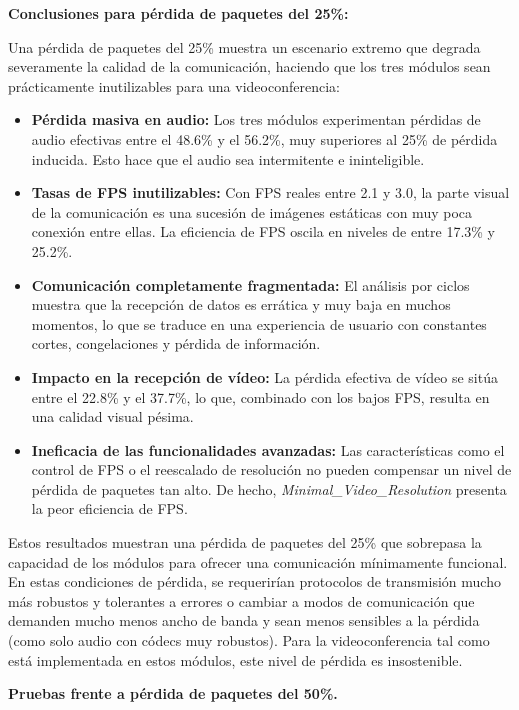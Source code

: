 \textbf{Conclusiones para pérdida de paquetes del 25\%:}

Una pérdida de paquetes del 25\% muestra un escenario extremo que degrada severamente la calidad de la comunicación, haciendo que los tres módulos sean prácticamente inutilizables para una videoconferencia:

\begin{itemize}
\item \textbf{Pérdida masiva en audio:} Los tres módulos experimentan pérdidas de audio efectivas entre el 48.6\% y el 56.2\%, muy superiores al 25\% de pérdida inducida. Esto hace que el audio sea intermitente e ininteligible.
\item \textbf{Tasas de FPS inutilizables:} Con FPS reales entre 2.1 y 3.0, la parte visual de la comunicación es una sucesión de imágenes estáticas con muy poca conexión entre ellas. La eficiencia de FPS oscila en niveles de entre 17.3\% y 25.2\%.
\item \textbf{Comunicación completamente fragmentada:} El análisis por ciclos muestra que la recepción de datos es errática y muy baja en muchos momentos, lo que se traduce en una experiencia de usuario con constantes cortes, congelaciones y pérdida de información.
\item \textbf{Impacto en la recepción de vídeo:} La pérdida efectiva de vídeo se sitúa entre el 22.8\% y el 37.7\%, lo que, combinado con los bajos FPS, resulta en una calidad visual pésima.
\item \textbf{Ineficacia de las funcionalidades avanzadas:} Las características como el control de FPS o el reescalado de resolución no pueden compensar un nivel de pérdida de paquetes tan alto. De hecho, \textit{Minimal\_Video\_Resolution} presenta la peor eficiencia de FPS.
\end{itemize}

Estos resultados muestran una pérdida de paquetes del 25\% que sobrepasa la capacidad de los módulos para ofrecer una comunicación mínimamente funcional. En estas condiciones de pérdida, se requerirían protocolos de transmisión mucho más robustos y tolerantes a errores o cambiar a modos de comunicación que demanden mucho menos ancho de banda y sean menos sensibles a la pérdida (como solo audio con códecs muy robustos). Para la videoconferencia tal como está implementada en estos módulos, este nivel de pérdida es insostenible.
\newpage

\textbf{Pruebas frente a pérdida de paquetes del 50\%.}
\vspace{\baselineskip}


